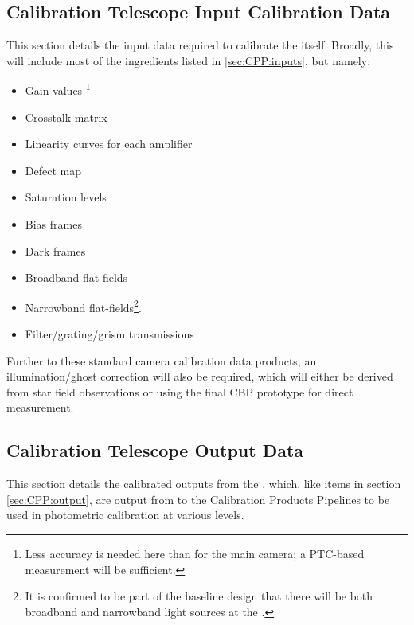 

\subsection{Calibration Telescope Input Calibration Data}
\label{sec:CPP:auxTelescope:inputs}
This section details the input data required to calibrate the \auxtelescope itself. Broadly, this will include most of the ingredients listed in \secsymbol\ref{sec:CPP:inputs}, but namely:

\begin{itemize}
	\item Gain values \footnote{Less accuracy is needed here than for the main camera; a PTC-based measurement will be sufficient.}
	\item Crosstalk matrix
	\item Linearity curves for each amplifier
	\item Defect map
	\item Saturation levels
	\item Bias frames
	\item Dark frames
	\item Broadband flat-fields
	\item Narrowband flat-fields\footnote{ It is confirmed to be part of the baseline design that there will be both broadband and narrowband light sources at the \auxtelescope.}.
	\item Filter/grating/grism transmissions
\end{itemize}

Further to these standard camera calibration data products, an illumination/ghost correction will also be required, which will either be derived from star field observations or using the final CBP prototype for direct measurement.







\subsection{Calibration Telescope Output Data}
\label{sec:CPP:auxTelescope:outputs}
This section details the calibrated outputs from the \auxtelescope, which, like items in section \secsymbol\ref{sec:CPP:output}, are output from to the Calibration Products Pipelines to be used in photometric calibration at various levels.


